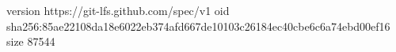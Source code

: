 version https://git-lfs.github.com/spec/v1
oid sha256:85ae22108da18e6022eb374afd667de10103c26184ec40cbe6c6a74ebd00ef16
size 87544
